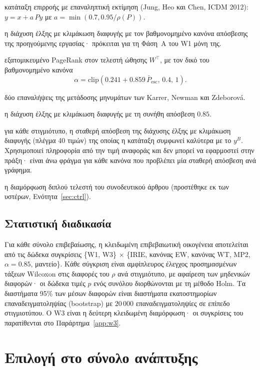 \documentclass[11pt,a4paper]{article}
\newcommand{\Pescbar}{\bar{P}_{\mathrm{esc}}}
\begin{document}
\begin{description}[leftmargin=1.2em,itemsep=2pt]
\item[IRIE] κατάταξη επιρροής με επαναληπτική εκτίμηση (Jung, Heo και Chen, ICDM 2012): $y=x+a\,Py$ με $a=\min(0.7,0.95/\rho(P))$.
\item[κανόνας EW] η διάχυση έλξης με κλιμάκωση διαφυγής με τον βαθμονομημένο κανόνα απόσβεσης της προηγούμενης εργασίας· πρόκειται για τη Φάση~Α του W1 μόνη της.
\item[κανόνας WT] εξατομικευμένο PageRank στον τελεστή ώθησης $W^{\top}$, με τον δικό του βαθμονομημένο κανόνα
\[\alpha=\mathrm{clip}(0.241+0.859\,\Pescbar,\,0.4,\,1).\]
\item[MP2] δύο επαναλήψεις της μετάδοσης μηνυμάτων των Karrer, Newman και Zdeborová.
\item[$\alpha{=}0.85$] η διάχυση έλξης με κλιμάκωση διαφυγής με τη συνήθη απόσβεση $0.85$.
\item[μαντείο (oracle)] για κάθε στιγμιότυπο, η σταθερή απόσβεση της διάχυσης έλξης με κλιμάκωση διαφυγής (πλέγμα 40 τιμών) της οποίας η κατάταξη συμφωνεί καλύτερα με το $y^B$. Χρησιμοποιεί πληροφορία από την τιμή αναφοράς και δεν μπορεί να εφαρμοστεί στην πράξη· είναι άνω φράγμα για κάθε κανόνα που προβλέπει μία σταθερή απόσβεση ανά γράφημα.
\item[CTRL] η διαμόρφωση διπλού τελεστή του συνοδευτικού άρθρου (προστέθηκε εκ των υστέρων, Ενότητα~\ref{sec:ctrl}).
\end{description}

\subsection{Στατιστική διαδικασία}

Για κάθε σύνολο επιβεβαίωσης, η κλειδωμένη επιβεβαιωτική οικογένεια αποτελείται από τις δώδεκα συγκρίσεις \{W1, W3\} $\times$ \{IRIE, κανόνας EW, κανόνας WT, MP2, $\alpha{=}0.85$, μαντείο\}. Κάθε σύγκριση είναι αμφίπλευρος έλεγχος προσημασμένων τάξεων Wilcoxon στις διαφορές του $\rho$ ανά στιγμιότυπο, με αφαίρεση των μηδενικών διαφορών· οι δώδεκα τιμές $p$ ενός συνόλου διορθώνονται με τη μέθοδο Holm. Τα διαστήματα 95\% των μέσων διαφορών είναι διαστήματα εκατοστημορίων επαναδειγματοληψίας (bootstrap) με $20\,000$ επαναδειγματοληψίες σε επίπεδο στιγμιοτύπου. Ο W3 είναι η δεύτερη κλειδωμένη διαμόρφωση· οι συγκρίσεις του παρατίθενται στο Παράρτημα~\ref{app:w3}.

\section{Επιλογή στο σύνολο ανάπτυξης}\label{sec:selection}
\end{document}
